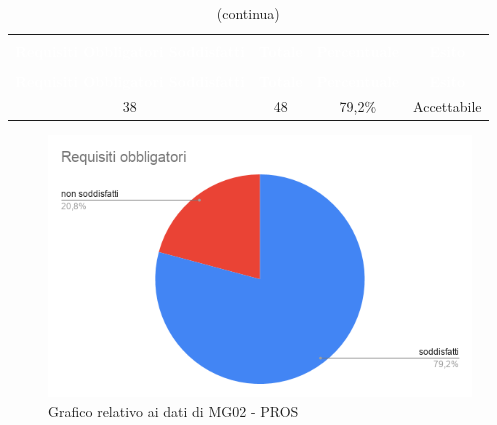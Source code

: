 \begin{longtable}{c c c c}
\rowcolor{white}\caption{Esiti MG02 - PROS}\\
		\rowcolor{redafk}
\textcolor{white}{\textbf{Requisiti Obbligatori Soddisfatti}} & \textcolor{white}{\textbf{Totale}} & 
\textcolor{white}{\textbf{Percentuale}} & \textcolor{white}{\textbf{Esito}}\\
		\endfirsthead
		\rowcolor{white}\caption[]{(continua)} \\
		\rowcolor{redafk}
\textcolor{white}{\textbf{Requisiti Obbligatori Soddisfatti}} & \textcolor{white}{\textbf{Totale}} & 
\textcolor{white}{\textbf{Percentuale}} & \textcolor{white}{\textbf{Esito}}\\
		\endhead
		38 & 48 & 79,2\% & Accettabile \\
\end{longtable}

\begin{figure}[H]
\centering
\includegraphics[scale=0.7]{./img/MG02.png}
\caption{Grafico relativo ai dati di MG02 - PROS}
\end{figure}

